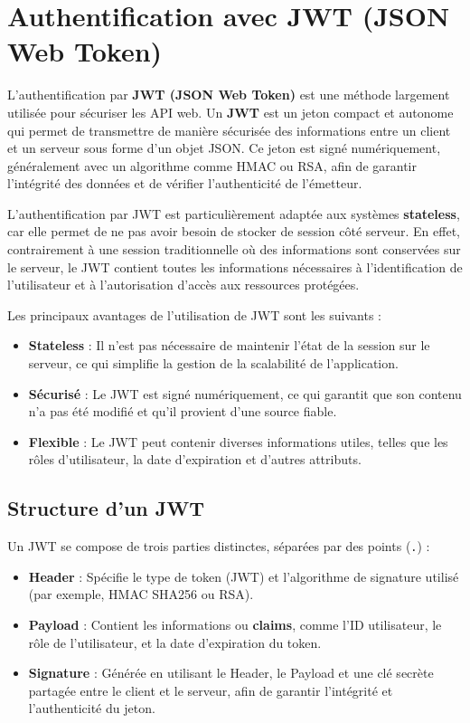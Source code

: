 \chapter{Authentification avec JWT (JSON Web Token)}


L'authentification par \textbf{JWT (JSON Web Token)} est une méthode largement utilisée pour sécuriser les API web. Un \textbf{JWT} est un jeton compact et autonome qui permet de transmettre de manière sécurisée des informations entre un client et un serveur sous forme d'un objet JSON. Ce jeton est signé numériquement, généralement avec un algorithme comme HMAC ou RSA, afin de garantir l'intégrité des données et de vérifier l'authenticité de l'émetteur.

L'authentification par JWT est particulièrement adaptée aux systèmes \textbf{stateless}, car elle permet de ne pas avoir besoin de stocker de session côté serveur. En effet, contrairement à une session traditionnelle où des informations sont conservées sur le serveur, le JWT contient toutes les informations nécessaires à l'identification de l'utilisateur et à l'autorisation d'accès aux ressources protégées.

Les principaux avantages de l'utilisation de JWT sont les suivants :
\begin{itemize}
    \item \textbf{Stateless} : Il n'est pas nécessaire de maintenir l'état de la session sur le serveur, ce qui simplifie la gestion de la scalabilité de l'application.
    \item \textbf{Sécurisé} : Le JWT est signé numériquement, ce qui garantit que son contenu n’a pas été modifié et qu’il provient d’une source fiable.
    \item \textbf{Flexible} : Le JWT peut contenir diverses informations utiles, telles que les rôles d’utilisateur, la date d’expiration et d'autres attributs.
\end{itemize}


\section{Structure d’un JWT}

Un JWT se compose de trois parties distinctes, séparées par des points (\texttt{.}) :
\begin{itemize}
    \item \textbf{Header} : Spécifie le type de token (JWT) et l’algorithme de signature utilisé (par exemple, HMAC SHA256 ou RSA).
    \item \textbf{Payload} : Contient les informations ou \textbf{claims}, comme l’ID utilisateur, le rôle de l’utilisateur, et la date d’expiration du token.
    \item \textbf{Signature} : Générée en utilisant le Header, le Payload et une clé secrète partagée entre le client et le serveur, afin de garantir l’intégrité et l'authenticité du jeton.
\end{itemize}

